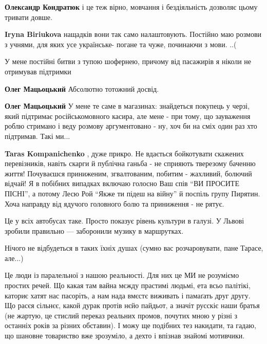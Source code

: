 \begin{itemize}
\begin{itemize}
\textbf{Олександр Кондратюк} і це теж вірно, мовчання і бездіяльність дозволяє цьому тривати довше.

\textbf{Iryna Biriukova} нащадків вони так само налаштовують. Постійно маю розмови з учнями, для яких усе українське- погане та чуже, починаючи з мови. ..(
\end{itemize} %


У мене постійні битви з тупою шофернею, причому від пасажирів я ніколи не
отримував підтримки

\begin{itemize} %
\textbf{Олег Мацьоцький} Абсолютно тотожний досвід.

\textbf{Олег Мацьоцький} У мене те саме в магазинах: знайдеться покупець у черзі, який підтримає російськомовного касира, але мене - при тому, що зауваження роблю стримано і веду розмову аргументовано - ну, хоч би на сміх один раз хто підтримав. Такі ми...

\textbf{Taras Kompanichenko} , дуже прикро. Не вдається бойкотувати скажених перевізників, навіть скарги й публічна ганьба - не сприяють тверезому баченню життя!
Почуваєшся приниженим, згвалтованим, побитим - жахливий, болючий відчай!
Я в побібних випадках включаю голосно
Ваш спів \enquote{ВИ ПРОСИТЕ ПІСНІ},
а потому Лесю Рой \enquote{Якже ти підеш на війну} й поспіль групу Пирятин.
Хоча направду від ядучого головного болю та приниження - не рятує.
\end{itemize} %

Це у всіх автобусах таке. Просто показує рівень культури в галузі.
У Львові зробили правильно — заборонили музику в маршрутках.


Нічого не відбудеться в таких їхніх душах (сумно вас розчаровувати, пане Тарасе, але...)

Це люди із паралельної з нашою реальності. Для них це МИ не розуміємо простих
речей. Що какая там вайна мєжду прастимі людьмі, ета всьо палітікі, каториє
хатят нас пасоріть, а нам нада вмєстє виживать і памаґать друг другу. Що расєя
сільнєє, какой дурак протів нєйо пайдьот, а значіт русскіє наши братья (не
жартую, це стислий переказ реальних промов, почутих мною у різні з останніх
років за різних обставин). І можу ще подібних тез накидати, та гадаю, що
шановне товариство вже зрозуміло, а дехто і впізнав знайомі мотивчики.


\end{itemize}
